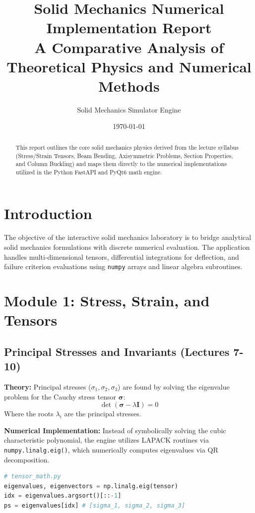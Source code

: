 \documentclass[11pt, a4paper]{article}
\title{\textbf{Solid Mechanics Numerical Implementation Report} \\ \Large A Comparative Analysis of Theoretical Physics and Numerical Methods}
\author{Solid Mechanics Simulator Engine}
\date{\today}
\begin{document}
\maketitle

\begin{abstract}
This report outlines the core solid mechanics physics derived from the lecture syllabus (Stress/Strain Tensors, Beam Bending, Axisymmetric Problems, Section Properties, and Column Buckling) and maps them directly to the numerical implementations utilized in the Python FastAPI and PyQt6 math engine.
\end{abstract}

\tableofcontents
\newpage

\section{Introduction}
The objective of the interactive solid mechanics laboratory is to bridge analytical solid mechanics formulations with discrete numerical evaluation. The application handles multi-dimensional tensors, differential integrations for deflection, and failure criterion evaluations using \texttt{numpy} arrays and linear algebra subroutines.

\section{Module 1: Stress, Strain, and Tensors}
\subsection{Principal Stresses and Invariants (Lectures 7-10)}
\textbf{Theory:} Principal stresses ($\sigma_1, \sigma_2, \sigma_3$) are found by solving the eigenvalue problem for the Cauchy stress tensor $\boldsymbol{\sigma}$:
\begin{equation}
\det(\boldsymbol{\sigma} - \lambda \mathbf{I}) = 0
\end{equation}
Where the roots $\lambda_i$ are the principal stresses.

\textbf{Numerical Implementation:} 
Instead of symbolically solving the cubic characteristic polynomial, the engine utilizes LAPACK routines via \texttt{numpy.linalg.eig()}, which numerically computes eigenvalues via QR decomposition.
\begin{lstlisting}[language=Python]
# tensor_math.py
eigenvalues, eigenvectors = np.linalg.eig(tensor)
idx = eigenvalues.argsort()[::-1]   
ps = eigenvalues[idx] # [sigma_1, sigma_2, sigma_3]
\end{lstlisting}
\end{document}
